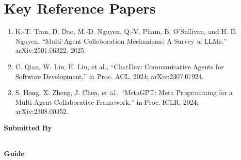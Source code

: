 \documentclass[11pt]{article}
\begin{document}
\section*{Key Reference Papers}
\begin{enumerate}
  \item K.-T. Tran, D. Dao, M.-D. Nguyen, Q.-V. Pham, B. O'Sullivan, and H. D. Nguyen, ``Multi-Agent Collaboration Mechanisms: A Survey of LLMs,'' arXiv:2501.06322, 2025.
  \item C. Qian, W. Liu, H. Liu, et al., ``ChatDev: Communicative Agents for Software Development,'' in Proc. ACL, 2024; arXiv:2307.07924.
  \item S. Hong, X. Zheng, J. Chen, et al., ``MetaGPT: Meta Programming for a Multi-Agent Collaborative Framework,'' in Proc. ICLR, 2024; arXiv:2308.00352.
\end{enumerate}
\vspace{0.8em}
\noindent\textbf{Submitted By}\\
\seminarName\\
\seminarRoll

\vspace{0.6em}
\noindent\textbf{Guide}\\
\seminarGuide
\end{document}
